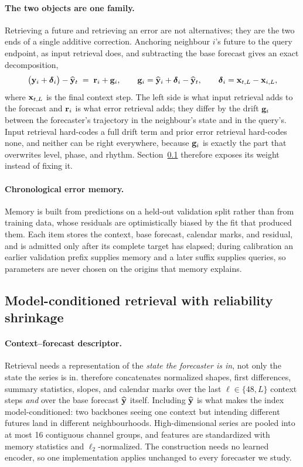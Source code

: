 \paragraph{The two objects are one family.}
Retrieving a future and retrieving an error are not alternatives; they are the
two ends of a single additive correction. Anchoring neighbour $i$'s future to the
query endpoint, as input retrieval does, and subtracting the base forecast gives
an exact decomposition,
\begin{equation}
  \big(\mathbf{y}_i + \boldsymbol{\delta}_i\big) - \widehat{\mathbf{y}}_t
  \;=\;
  \mathbf{r}_i + \mathbf{g}_i,
  \qquad
  \mathbf{g}_i = \widehat{\mathbf{y}}_i + \boldsymbol{\delta}_i - \widehat{\mathbf{y}}_t,
  \qquad
  \boldsymbol{\delta}_i = \mathbf{x}_{t,L} - \mathbf{x}_{i,L},
  \label{eq:objects}
\end{equation}
where $\mathbf{x}_{t,L}$ is the final context step. The left side is what input
retrieval adds to the forecast and $\mathbf{r}_i$ is what error retrieval adds; they
differ by the drift $\mathbf{g}_i$ between the forecaster's trajectory in the
neighbour's state and in the query's. Input retrieval hard-codes a full drift term
and prior error retrieval hard-codes none, and neither can be right everywhere,
because $\mathbf{g}_i$ is exactly the part that overwrites level, phase, and rhythm.
Section~\ref{sec:retrieval} therefore exposes its weight instead of fixing it.

\paragraph{Chronological error memory.}
Memory is built from predictions on a held-out validation split rather than from
training data, whose residuals are optimistically biased by the fit that produced
them. Each item stores the context, base forecast, calendar marks, and residual, and
is admitted only after its complete target has elapsed; during calibration an
earlier validation prefix supplies memory and a later suffix supplies queries, so
parameters are never chosen on the origins that memory explains.

\subsection{Model-conditioned retrieval with reliability shrinkage}
\label{sec:retrieval}

\paragraph{Context--forecast descriptor.}
Retrieval needs a representation of the \emph{state the forecaster is in}, not
only the state the series is in. \method{} therefore concatenates normalized
shapes, first differences, summary statistics, slopes, and calendar marks over
the last $\ell\in\{48,L\}$ context steps \emph{and} over the base forecast
$\widehat{\mathbf{y}}$ itself. Including $\widehat{\mathbf{y}}$ is what makes the index model-conditioned:
two backbones seeing one context but intending different futures land in
different neighbourhoods. High-dimensional series are pooled into at most 16
contiguous channel groups, and features are standardized with memory statistics and
$\ell_2$-normalized. The construction needs no learned encoder, so one
implementation applies unchanged to every forecaster we study.

